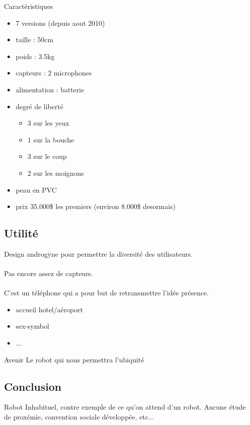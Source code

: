 \documentclass{beamer}
\begin{document}
\begin{frame}{Caractéristiques}
  \begin{itemize}
  \item 7 versions (depuis aout 2010)
  \item taille : 50cm
  \item poids : 3.5kg
  \item capteurs : 2 microphones
  \item alimentation : batterie
  \item degré de liberté
    \begin{itemize}
    \item 3 sur les yeux
    \item 1 sur la bouche
    \item 3 sur le coup
    \item 2 sur les moignons
    \end{itemize}
  \item peau en PVC
  \item prix 35.000\$ les premiers (environ 8.000\$ desormais)
  \end{itemize}
\end{frame}

\subsection{Utilité}
\begin{frame}
  Design androgyne pour permettre la diversité des utilisateurs.
  \\~\\
  Pas encore assez de capteurs.
  \\~\\
  C'est un téléphone qui a pour but de retransmettre l'idée présence.
  \\
  \begin{itemize}
  \item accueil hotel/aéroport
  \item sex-symbol
  \item ...
  \end{itemize}
\end{frame}

\begin{frame}{Avenir}
  Le robot qui nous permettra l'ubiquité\\
\end{frame}

\subsection{Conclusion}
\begin{frame}
  Robot Inhabituel, contre exemple de ce qu'on attend d'un robot.
  Aucune étude de proxémie, convention sociale développée, etc...
\end{frame}
\end{document}
